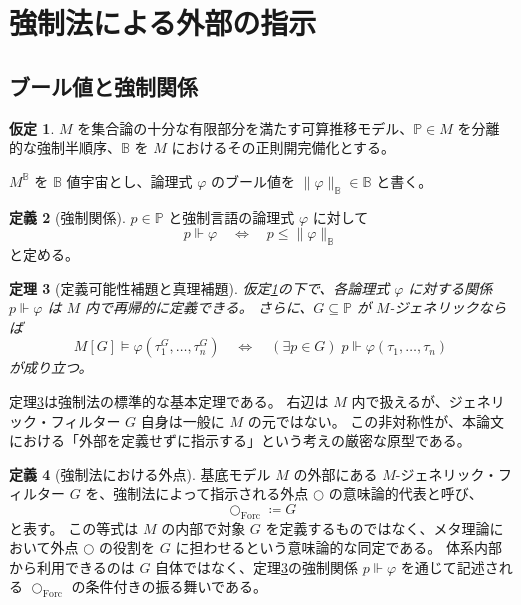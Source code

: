 \documentclass[11pt]{ltjsarticle}
\theoremstyle{plain}
\newtheorem{theorem}{定理}[section]
\theoremstyle{definition}
\newtheorem{definition}[theorem]{定義}
\newtheorem{assumption}[theorem]{仮定}
\newcommand{\dfix}{\bigcirc}
\begin{document}
\section{強制法による外部の指示}
\label{sec:forcing}

\subsection{ブール値と強制関係}

\begin{assumption}\label{ass:forcing}
\(M\) を集合論の十分な有限部分を満たす可算推移モデル、\(\mathbb{P}\in M\) を分離的な強制半順序、\(\mathbb{B}\) を \(M\) におけるその正則開完備化とする。
\end{assumption}

\(M^{\mathbb{B}}\) を \(\mathbb{B}\) 値宇宙とし、論理式 \(\varphi\) のブール値を
\(\lVert\varphi\rVert_{\mathbb{B}}\in\mathbb{B}\) と書く。

\begin{definition}[強制関係]
\(p\in\mathbb{P}\) と強制言語の論理式 \(\varphi\) に対して
\[
p\Vdash\varphi
\quad\Longleftrightarrow\quad
p\leq\lVert\varphi\rVert_{\mathbb{B}}
\]
と定める。
\end{definition}

\begin{theorem}[定義可能性補題と真理補題]\label{thm:forcing}
仮定\ref{ass:forcing}の下で、各論理式 \(\varphi\) に対する関係
\(p\Vdash\varphi\) は \(M\) 内で再帰的に定義できる。
さらに、\(G\subseteq\mathbb{P}\) が \(M\)-ジェネリックならば
\[
M[G]\models\varphi(\tau_1^G,\ldots,\tau_n^G)
\quad\Longleftrightarrow\quad
(\exists p\in G)\;p\Vdash\varphi(\tau_1,\ldots,\tau_n)
\]
が成り立つ。
\end{theorem}

定理\ref{thm:forcing}は強制法の標準的な基本定理である\cite{cohen1963,bell1985,jech2003}。
右辺は \(M\) 内で扱えるが、ジェネリック・フィルター \(G\) 自身は一般に \(M\) の元ではない。
この非対称性が、本論文における「外部を定義せずに指示する」という考えの厳密な原型である。

\begin{definition}[強制法における外点]\label{def:forcing-outer-point}
基底モデル \(M\) の外部にある \(M\)-ジェネリック・フィルター \(G\) を、強制法によって指示される外点 \(\dfix\) の意味論的代表と呼び、
\[
\dfix_{\mathrm{Forc}}\coloneqq G
\]
と表す。
この等式は \(M\) の内部で対象 \(G\) を定義するものではなく、メタ理論において外点 \(\dfix\) の役割を \(G\) に担わせるという意味論的な同定である。
体系内部から利用できるのは \(G\) 自体ではなく、定理\ref{thm:forcing}の強制関係 \(p\Vdash\varphi\) を通じて記述される \(\dfix_{\mathrm{Forc}}\) の条件付きの振る舞いである。
\end{definition}
\end{document}
